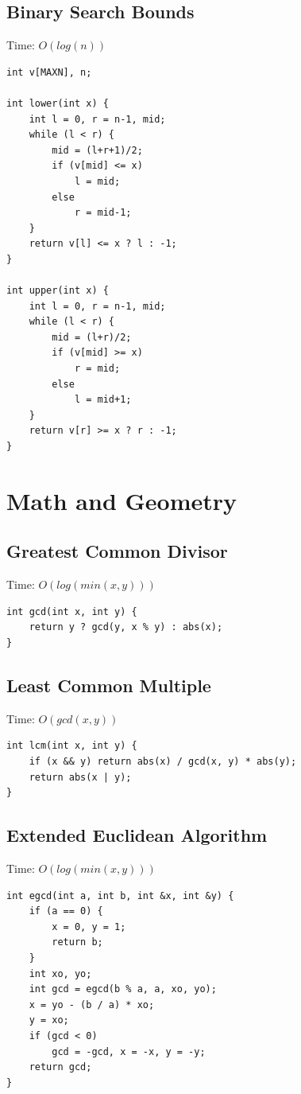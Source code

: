 \documentclass[oneside]{article}
\begin{document}
\subsection{Binary Search Bounds}
Time: $O(log(n))$
\begin{lstlisting}
int v[MAXN], n;

int lower(int x) {
	int l = 0, r = n-1, mid;
	while (l < r) {
		mid = (l+r+1)/2;
		if (v[mid] <= x)
			l = mid;
		else
			r = mid-1;
	}
	return v[l] <= x ? l : -1;
}

int upper(int x) {
	int l = 0, r = n-1, mid;
	while (l < r) {
		mid = (l+r)/2;
		if (v[mid] >= x)
			r = mid;
		else
			l = mid+1;
	}
	return v[r] >= x ? r : -1;
}
\end{lstlisting}

\pagebreak
\section{Math and Geometry}

\subsection{Greatest Common Divisor}
Time: $O(log(min(x, y)))$
\begin{lstlisting}
int gcd(int x, int y) {
	return y ? gcd(y, x % y) : abs(x);
}
\end{lstlisting}

\subsection{Least Common Multiple}
Time: $O(gcd(x, y))$
\begin{lstlisting}
int lcm(int x, int y) {
	if (x && y) return abs(x) / gcd(x, y) * abs(y);
	return abs(x | y);
}
\end{lstlisting}

\subsection{Extended Euclidean Algorithm}
Time: $O(log(min(x, y)))$
\begin{lstlisting}
int egcd(int a, int b, int &x, int &y) {
    if (a == 0) {
        x = 0, y = 1;
        return b;
    }
    int xo, yo;
    int gcd = egcd(b % a, a, xo, yo);
    x = yo - (b / a) * xo;
    y = xo;
    if (gcd < 0)
        gcd = -gcd, x = -x, y = -y;
    return gcd;
}
\end{lstlisting}
\end{document}
